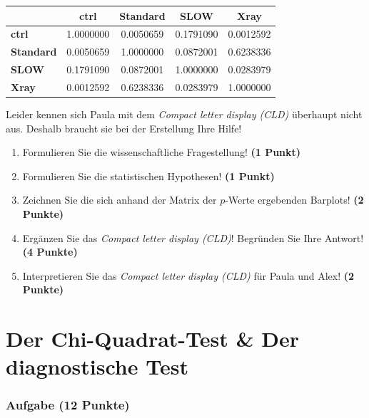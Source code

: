 \documentclass[a4paper, 9pt]{scrartcl}\usepackage[]{graphicx}\usepackage[]{xcolor}
\newenvironment{knitrout}{}{} %
\begin{document}
\begin{knitrout}
\color{fgcolor}\begin{table}[!h]
\centering\begingroup\fontsize{10}{12}\selectfont

\begin{tabular}{>{}lcccc}
\toprule
\textbf{ } & \textbf{ctrl} & \textbf{Standard} & \textbf{SLOW} & \textbf{Xray}\\
\midrule
\textbf{ctrl} & 1.0000000 & 0.0050659 & 0.1791090 & 0.0012592\\
\textbf{Standard} & 0.0050659 & 1.0000000 & 0.0872001 & 0.6238336\\
\textbf{SLOW} & 0.1791090 & 0.0872001 & 1.0000000 & 0.0283979\\
\textbf{Xray} & 0.0012592 & 0.6238336 & 0.0283979 & 1.0000000\\
\bottomrule
\end{tabular}
\endgroup{}
\end{table}

\end{knitrout}

Leider kennen sich Paula mit dem \textit{Compact letter display (CLD)} überhaupt nicht aus. Deshalb braucht sie bei der Erstellung Ihre Hilfe!

\begin{enumerate}
  \item Formulieren Sie die wissenschaftliche Fragestellung! \textbf{(1 Punkt)}
  \item Formulieren Sie die statistischen Hypothesen! \textbf{(1 Punkt)}
\item Zeichnen Sie die sich anhand der Matrix der $p$-Werte ergebenden Barplots! \textbf{(2 Punkte)}
\item Ergänzen Sie das \textit{Compact letter display (CLD)}! Begründen Sie Ihre Antwort! \textbf{(4 Punkte)}
\item Interpretieren Sie das \textit{Compact letter display (CLD)} für Paula und Alex! \textbf{(2 Punkte)} 
\end{enumerate}

 
\clearpage
\part{Der Chi-Quadrat-Test \& Der diagnostische Test}

\section{Aufgabe \hfill (12 Punkte)}
\end{document}
